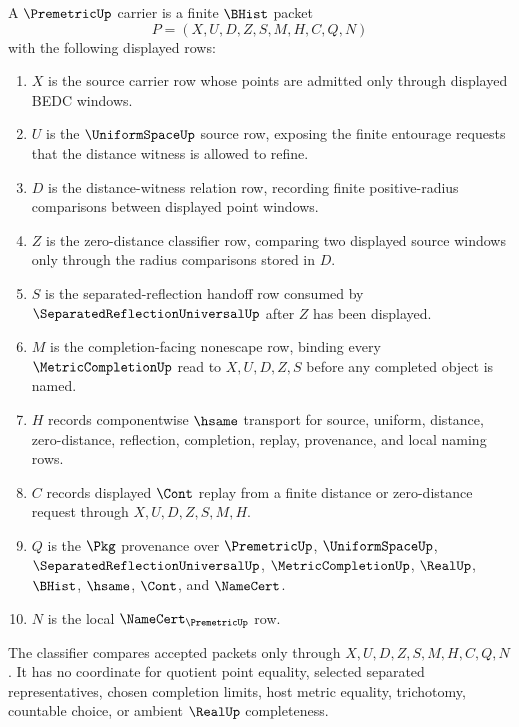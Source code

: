 \begin{definition}
\label{def:premetric-carrier}
A $\PremetricUp$ carrier is a finite $\BHist$ packet
$$
P=(X,U,D,Z,S,M,H,C,Q,N)
$$
with the following displayed rows:
\begin{enumerate}
\item $X$ is the source carrier row whose points are admitted only through displayed BEDC windows.
\item $U$ is the $\UniformSpaceUp$ source row, exposing the finite entourage requests that the distance witness is allowed to refine.
\item $D$ is the distance-witness relation row, recording finite positive-radius comparisons between displayed point windows.
\item $Z$ is the zero-distance classifier row, comparing two displayed source windows only through the radius comparisons stored in $D$.
\item $S$ is the separated-reflection handoff row consumed by $\SeparatedReflectionUniversalUp$ after $Z$ has been displayed.
\item $M$ is the completion-facing nonescape row, binding every $\MetricCompletionUp$ read to $X,U,D,Z,S$ before any completed object is named.
\item $H$ records componentwise $\hsame$ transport for source, uniform, distance, zero-distance, reflection, completion, replay, provenance, and local naming rows.
\item $C$ records displayed $\Cont$ replay from a finite distance or zero-distance request through $X,U,D,Z,S,M,H$.
\item $Q$ is the $\Pkg$ provenance over $\PremetricUp$, $\UniformSpaceUp$, $\SeparatedReflectionUniversalUp$, $\MetricCompletionUp$, $\RealUp$, $\BHist$, $\hsame$, $\Cont$, and $\NameCert$.
\item $N$ is the local $\NameCert_{\PremetricUp}$ row.
\end{enumerate}
The classifier compares accepted packets only through $X,U,D,Z,S,M,H,C,Q,N$. It has no coordinate for quotient point equality, selected separated representatives, chosen completion limits, host metric equality, trichotomy, countable choice, or ambient $\RealUp$ completeness.
\end{definition}

